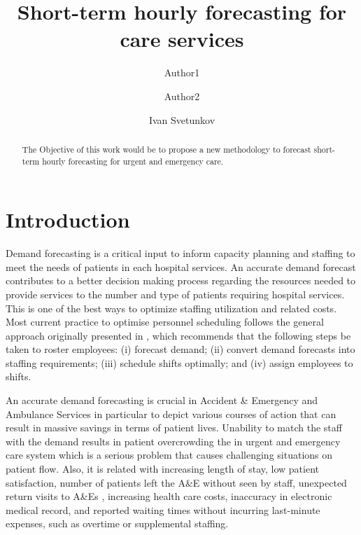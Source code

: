 \documentclass[]{elsarticle} %
\begin{document}
\begin{frontmatter}

  \title{Short-term hourly forecasting for care services}
    \author[University1]{Author1}
    \author[University2]{Author2}
    \author[Centre for Marketing Analytics and Forecasting, Lancaster University, UK]{Ivan Svetunkov}
      \address[University1]{Cardiff business school, 3 Colum Drive, CF10 3EU, Cardiff}
    \address[University2]{adress2}
    \address[University3]{adress3}
  
  \begin{abstract}
  The Objective of this work would be to propose a new methodology to forecast short-term hourly forecasting for urgent and emergency care.
  \end{abstract}
  
 \end{frontmatter}

\hypertarget{introduction}{%
\section{Introduction}\label{introduction}}

Demand forecasting is a critical input to inform capacity planning and staffing to meet the needs of patients in each hospital services. An accurate demand forecast contributes to a better decision making process regarding the resources needed to provide services to the number and type of patients requiring hospital services. This is one of the best ways to optimize staffing utilization and related costs. Most current practice to optimise personnel scheduling follows the general approach originally presented in \citep{vile2016time}, which recommends that the following steps be taken to roster employees: (i) forecast demand; (ii) convert demand forecasts into staffing requirements; (iii) schedule shifts optimally; and (iv) assign employees to shifts.

An accurate demand forecasting is crucial in Accident \& Emergency and Ambulance Services in particular to depict various courses of action that can result in massive savings in terms of patient lives.
Unability to match the staff with the demand results in patient overcrowding the in urgent and emergency care system which is a serious problem that causes challenging situations on patient flow. Also, it is related with increasing length of stay, low patient satisfaction, number of patients left the A\&E without seen by staff, unexpected return visits to A\&Es , increasing health care costs, inaccuracy in electronic medical record, and reported waiting times without incurring last-minute expenses, such as overtime or supplemental staffing.
\end{document}
